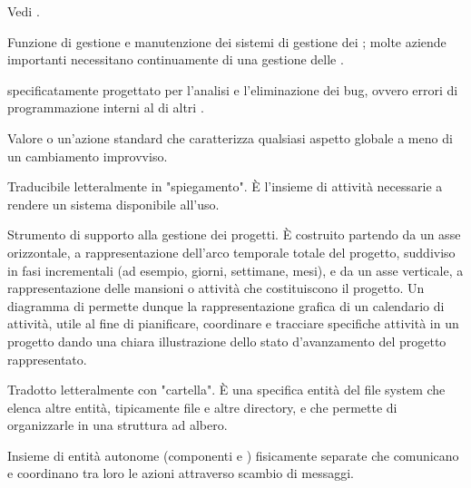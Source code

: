 { 
{Vedi .}

{Funzione di gestione e manutenzione dei sistemi di gestione dei ; molte aziende importanti necessitano continuamente di una gestione delle .}

{ specificatamente progettato per l'analisi e l'eliminazione dei bug, ovvero errori di programmazione interni al  di altri .}

{Valore o un'azione standard che caratterizza qualsiasi aspetto globale a meno di un cambiamento improvviso.}


{Traducibile letteralmente in "spiegamento". \`{E} l'insieme di attività necessarie a rendere un sistema  disponibile all'uso.}





{Strumento di supporto alla gestione dei progetti. \`{E} costruito partendo da un asse orizzontale, a rappresentazione dell'arco temporale totale del progetto, suddiviso in fasi incrementali (ad esempio, giorni, settimane, mesi), e da un asse verticale, a rappresentazione delle mansioni o attività che costituiscono il progetto. Un diagramma di  permette dunque la rappresentazione grafica di un calendario di attività, utile al fine di pianificare, coordinare e tracciare specifiche attività in un progetto dando una chiara illustrazione dello stato d'avanzamento del progetto rappresentato.} 



{Tradotto letteralmente con "cartella". \`{E} una specifica entit\`{a} del file system che elenca altre entit\`{a}, tipicamente file e altre directory, e che permette di organizzarle in una struttura ad albero.}


{Insieme di entità autonome (componenti  e ) fisicamente separate che comunicano e coordinano tra loro le azioni attraverso scambio di messaggi.}

}
